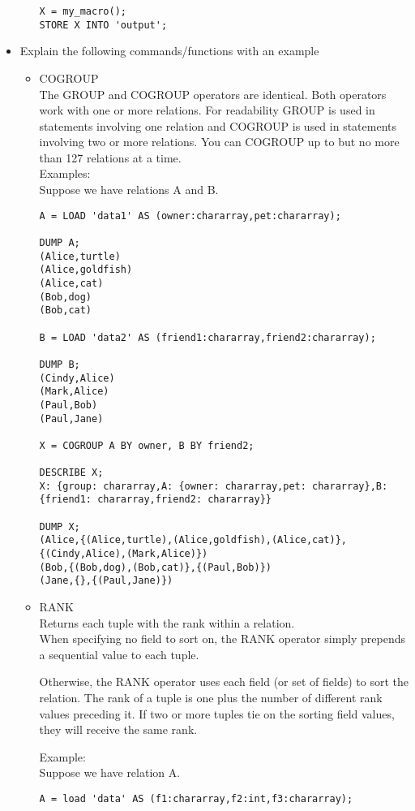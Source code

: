\documentclass[12pt]{article}
\begin{document}
\begin{itemize}
\begin{itemize}
\begin{lstlisting}
X = my_macro();
STORE X INTO 'output';
			\end{lstlisting}
		\end{itemize}
				
		\item Explain the following commands/functions with an example\\
			\begin{itemize}
				\item COGROUP\\
				The GROUP and COGROUP operators are identical. Both operators work with one or more relations. For readability GROUP is used in statements involving one relation and COGROUP is used in statements involving two or more relations. You can COGROUP up to but no more than 127 relations at a time.\\
				Examples:\\
				Suppose we have relations A and B.
				\begin{lstlisting}
A = LOAD 'data1' AS (owner:chararray,pet:chararray);

DUMP A;
(Alice,turtle)
(Alice,goldfish)
(Alice,cat)
(Bob,dog)
(Bob,cat)

B = LOAD 'data2' AS (friend1:chararray,friend2:chararray);

DUMP B;
(Cindy,Alice)
(Mark,Alice)
(Paul,Bob)
(Paul,Jane)

X = COGROUP A BY owner, B BY friend2;

DESCRIBE X;
X: {group: chararray,A: {owner: chararray,pet: chararray},B: {friend1: chararray,friend2: chararray}}

DUMP X;
(Alice,{(Alice,turtle),(Alice,goldfish),(Alice,cat)},{(Cindy,Alice),(Mark,Alice)})
(Bob,{(Bob,dog),(Bob,cat)},{(Paul,Bob)})
(Jane,{},{(Paul,Jane)})
				\end{lstlisting}
				\item RANK\\
				Returns each tuple with the rank within a relation.\\
				When specifying no field to sort on, the RANK operator simply prepends a sequential value to each tuple.

Otherwise, the RANK operator uses each field (or set of fields) to sort the relation. The rank of a tuple is one plus the number of different rank values preceding it. If two or more tuples tie on the sorting field values, they will receive the same rank.
				
				Example:\\
				Suppose we have relation A.
				\begin{lstlisting}
A = load 'data' AS (f1:chararray,f2:int,f3:chararray);
   

\end{lstlisting}
\end{itemize}
\end{itemize}
\end{document}
